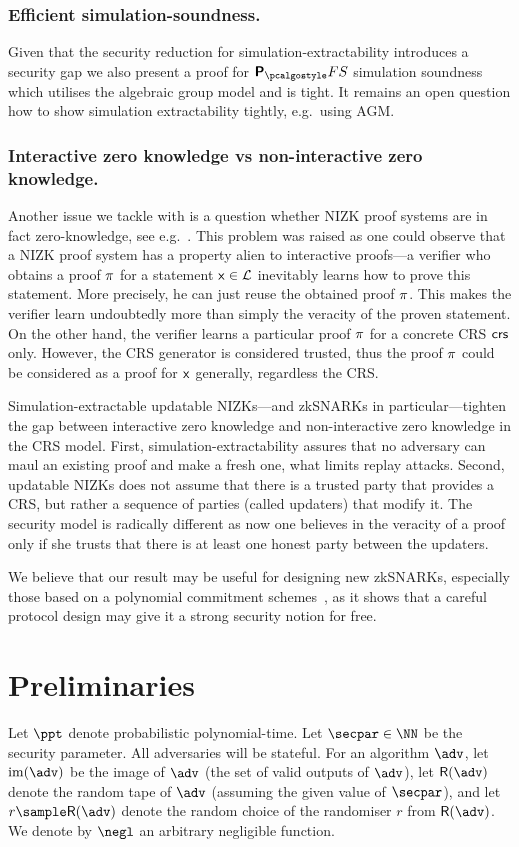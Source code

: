 \let\accentvec\vec \documentclass[runningheads,10pt]{llncs}
\begin{document}
\subsubsection{Efficient simulation-soundness.}
Given that the security reduction for simulation-extractability introduces a security gap we also present a proof for $\plonkprot_\fs$ simulation soundness which utilises the algebraic group model and is tight. 
It remains an open question how to show simulation extractability tightly, e.g.~using AGM.

\subsubsection{Interactive zero knowledge vs non-interactive zero knowledge.}
Another issue we tackle with is a question whether NIZK proof systems are in
fact zero-knowledge, see e.g.~\cite{C:Pass03}. This problem was raised as one
could observe that a NIZK proof system has a property alien to interactive
proofs---a verifier who obtains a proof $\pi$ for a statement $\mathsf{x} \in
\mathcal{L}$ inevitably learns how to prove this statement. More precisely, he can
just reuse the obtained proof $\pi$. This makes the verifier learn
undoubtedly more than simply the veracity of the proven statement. On the other
hand, the verifier learns a particular proof $\pi$ for a concrete CRS
$\mathsf{crs}$ only. However, the CRS generator is considered trusted, thus the proof
$\pi$ could be considered as a proof for $\mathsf{x}$ generally, regardless the
CRS.

Simulation-extractable updatable NIZKs---and zkSNARKs in particular---tighten
the gap between interactive zero knowledge and non-interactive zero knowledge in
the CRS model. First, simulation-extractability assures that no adversary can
maul an existing proof and make a fresh one, what limits replay attacks.
Second, updatable NIZKs does not assume that there is a trusted party that
provides a CRS, but rather a sequence of parties (called updaters) that modify
it. The security model is radically different as now one believes in the
veracity of a proof only if she trusts that there is at least one honest party
between the updaters. 

We believe that our result may be useful for designing new zkSNARKs, especially those based on a polynomial commitment schemes~\cite{AC:KatZavGol10}, as it shows that a careful protocol design may give it a strong security notion for free.

\section{Preliminaries}
Let $\ppt$ denote probabilistic polynomial-time.
Let $\secpar \in \NN$ be the security parameter.
All adversaries will be stateful.
For an algorithm $\adv$, let $\image (\adv)$ be the image of $\adv$ (the set of valid outputs of $\adv$), let $\RND{\adv}$ denote the random tape of $\adv$ (assuming the given value of $\secpar$), and let $r \sample \RND{\adv}$ denote the random choice of the randomiser $r$ from $\RND{\adv}$.
We denote by $\negl$ an arbitrary negligible function.
\end{document}
